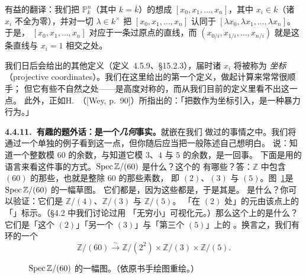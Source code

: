 有益的翻译：我们把 $\mathbb{P}^n_k$（其中 $k=\overline{k}$）的\trClosedPoint{}想成%
$[x_0,x_1,\dots,x_n]$，其中 $x_i\in k$（诸 $x_i$ 不全为零），并对一切 $\lambda\in k^{\times}$ 把%
$[x_0,x_1,\dots,x_n]$ 认同于 $[\lambda x_0,\lambda x_1,\dots,\lambda x_n]$。于是，%
$[x_0,x_1,\dots,x_n]$ 对应于一条过原点的直线，而 $(x_{0/i},x_{1/i},\dots,x_{n/i})$ 就是这条直线与%
\trHyperplane{} $x_i=1$ 相交之处。

我们日后会给出\trProjectiveSpace{}的其他定义（定义~4.5.9、\S15.2.3），届时诸 $x_i$ 将被称为%
\emph{\trProjective{}坐标}（projective coordinates）。我们在这里给出的第一个定义，做起计算来常常很顺手；%
但它有些不自然之处——\trProjectiveSpace{}是高度对称的，而从我们目前的定义里看不出这一点。%
此外，正如H.~\trWeyl（[Wey, p.~90]）所指出的：「把数作为坐标引入，是一种暴力行为。」

\textbf{4.4.11.\ 有趣的题外话：\trChineseRemainderTheorem{}是一个\emph{几何}事实。}\quad \trChineseRemainderTheorem{}就嵌在我们%
做过的事情之中。我们将通过一个单独的例子看到这一点，但你随后应当把一般陈述自己想明白。%
\trChineseRemainderTheorem{}说：知道一个整数模 $60$ 的余数，与知道它模 $3$、$4$ 与 $5$ 的余数，是一回事。%
下面是用\trScheme{}的语言来看这件事的方式。$\operatorname{Spec}\mathbb{Z}/(60)$ 是什么？这个\trRing{}的\trPrimeIdeal{}%
有哪些？答：$\mathbb{Z}$ 中包含 $(60)$ 的那些\trPrimeIdeal，也就是整除 $60$ 的那些素数，%
即 $(2)$、$(3)$ 与 $(5)$。图~\ref{fig:spec-z-60}是 $\operatorname{Spec}\mathbb{Z}/(60)$ 的一幅草图。%
它们都是\trClosedPoint，因为这些都是\trMaximalIdeal，于是其\trTopology{}是\trDiscreteTopology。%
\trStalk{}是什么？你可以验证：它们是 $\mathbb{Z}/(4)$、$\mathbb{Z}/(3)$ 与 $\mathbb{Z}/(5)$。%
「在 $(2)$ 处」的\trNilpotent{}元由该点上的「\trFuzz{}」标示。（\S4.2 中我们讨论过用%
「无穷小\trFuzz{}」可视化\trNilpotent{}元。）那么这个\trScheme{}上的\trGlobalSections{}是什么？%
它们是「这个\trOpenSet{} $(2)$」「另一个\trOpenSet{} $(3)$」与「第三个\trOpenSet{} $(5)$」上的%
\trSection。换言之，我们有环的一个\trNaturalIsomorphism
\[
\mathbb{Z}/(60)\overset{\sim}{\longrightarrow}\mathbb{Z}/(2^2)\times\mathbb{Z}/(3)\times\mathbb{Z}/(5).
\]

\begin{figure}[htbp]
\centering
{}
\caption{$\operatorname{Spec}\mathbb{Z}/(60)$ 的一幅图。（依原书手绘图重绘。）}%
\label{fig:spec-z-60}
\end{figure}

